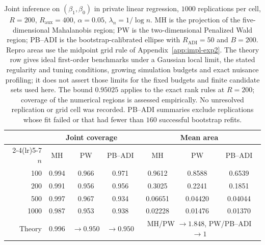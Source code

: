 \begin{table}[H]
\centering
\small
\begin{tabular}{@{}r ccc ccc@{}}
\toprule
& \multicolumn{3}{c}{Joint coverage} & \multicolumn{3}{c}{Mean area} \\
\cmidrule(lr){2-4}\cmidrule(lr){5-7}
\(n\) & MH & PW & PB--ADI & MH & PW & PB--ADI \\
\midrule
100  & 0.994 & 0.966 & 0.971 & 0.9612  & 0.8588  & 0.6539  \\
200  & 0.991 & 0.956 & 0.956 & 0.3025  & 0.2241  & 0.1851  \\
500  & 0.997 & 0.967 & 0.934 & 0.06651 & 0.04420 & 0.04044 \\
1000 & 0.987 & 0.953 & 0.938 & 0.02228 & 0.01476 & 0.01370 \\
\midrule
Theory & 0.996 & \(\to0.950\) & \(\to0.950\)
       & \multicolumn{3}{c}{MH/PW \(\to1.848\), PW/PB--ADI \(\to1\)} \\
\bottomrule
\end{tabular}
\caption{Joint inference on \((\beta_1,\beta_0)\) in private linear regression,
\(1000\) replications per cell, \(R=200\), \(R_{\mathrm{aux}}=400\),
\(\alpha=0.05\), \(\lambda_n=1/\log n\). MH is the projection of the
five-dimensional Mahalanobis region; PW is the two-dimensional Penalized Wald
region; PB--ADI is the bootstrap-calibrated ellipse with \(R_{\mathrm{ADI}}=50\)
and \(B=200\). Repro areas use the midpoint grid rule of
Appendix~\ref{app:impl-exp2}. The theory row gives ideal first-order
benchmarks under a Gaussian local limit, the stated regularity and tuning
conditions, growing simulation budgets and exact nuisance profiling; it
does not assert those limits for the fixed budgets and finite candidate
sets used here. The bound \(0.95025\) applies to the exact rank rules at
\(R=200\); coverage of the numerical regions is assessed empirically.
No unresolved replication or grid cell was recorded. PB--ADI summaries
exclude replications whose fit failed or that had fewer than \(160\)
successful bootstrap refits.}
\label{tab:exp2-joint}
\end{table}
